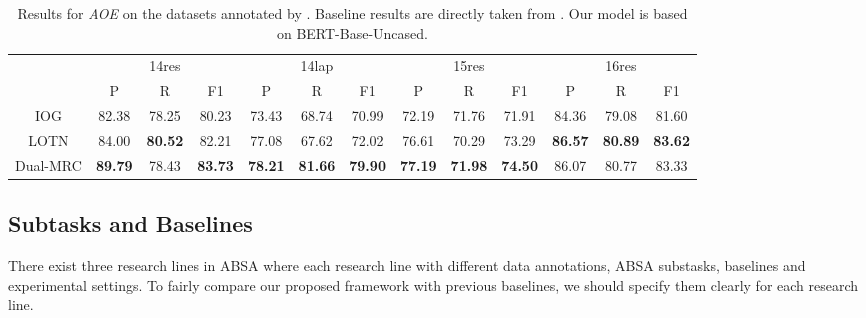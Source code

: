 \documentclass[letterpaper]{article} \usepackage{aaai21}  \usepackage{times}  \usepackage{helvet} \usepackage{courier}  \usepackage[hyphens]{url}  \usepackage{graphicx} \urlstyle{rm} \def\UrlFont{\rm}  \usepackage{natbib}  \usepackage{caption}
\begin{document}
\begin{table*}
    \centering
    \begin{tabular}{c|ccc|ccc|ccc|ccc}
    \hline
                & \multicolumn{3}{c|}{14res}     & \multicolumn{3}{c|}{14lap}     & \multicolumn{3}{c|}{15res}     & \multicolumn{3}{c}{16res}      \\ \cline{2-13} 
                & P     & R     & F1             & P     & R     & F1             & P     & R     & F1             & P     & R     & F1             \\ \hline
    IOG       & 82.38 & 78.25 & 80.23          & 73.43 & 68.74 & 70.99          & 72.19 & 71.76 & 71.91          & 84.36 & 79.08 & 81.60          \\
    LOTN      & 84.00 & \textbf{80.52} & 82.21          & 77.08 & 67.62 & 72.02          & 76.61 & 70.29 & 73.29          & \textbf{86.57} & \textbf{80.89} & \textbf{83.62} \\ \hline
    Dual-MRC  & \textbf{89.79} & 78.43 & \textbf{83.73} & \textbf{78.21} & \textbf{81.66} & \textbf{79.90} & \textbf{77.19} & \textbf{71.98} & \textbf{74.50} & 86.07 & 80.77 & 83.33          \\ \hline
    \end{tabular} 
    \caption{Results for \emph{AOE} on the datasets annotated by \cite{fan2019target}. 
    Baseline results are directly taken from \cite{DBLP:conf/aaai/WuZDHC20}. Our model is based on BERT-Base-Uncased.}
    \label{exp_2}
\end{table*}



\subsection{Subtasks and Baselines}
There exist three research lines in ABSA where each research line with different data annotations, ABSA substasks, baselines and experimental settings. 
To fairly compare our proposed framework with previous baselines, we should specify them clearly for each research line.
\end{document}
